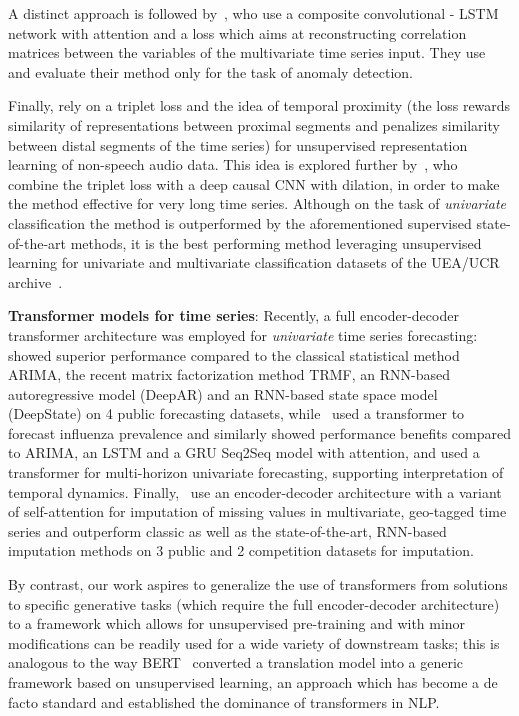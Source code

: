\documentclass{article} \usepackage{iclr2021_conference,times}
\begin{document}
A distinct approach is followed by~\citet{mscred_2019}, who use a composite convolutional - LSTM network with attention and a loss which aims at reconstructing correlation matrices between the variables of the multivariate time series input. They use and evaluate their method only for the task of anomaly detection.

Finally, \citet{jansen_unsupervised_2018} rely on a triplet loss and the idea of temporal proximity (the loss rewards similarity of representations between proximal segments and penalizes similarity between distal segments of the time series) for unsupervised representation learning of non-speech audio data. This idea is explored further by~\citet{franceschi19}, who combine the triplet loss with a deep causal CNN with dilation, in order to make the method effective for very long time series. Although on the task of \textit{univariate} classification the method is outperformed by the aforementioned supervised state-of-the-art methods, it is the best performing method leveraging unsupervised learning for univariate and multivariate classification datasets of the UEA/UCR archive~\citep{classification_archive}.


\textbf{Transformer models for time series}:
Recently, a full encoder-decoder transformer architecture was employed for \textit{univariate} time series forecasting: \citet{li2019enhancing} showed superior performance compared to the classical statistical method ARIMA, the recent matrix factorization method TRMF, an RNN-based autoregressive model (DeepAR) and an RNN-based state space model (DeepState) on 4 public forecasting datasets,  while~\citet{transformer_influenza} used a transformer to forecast influenza prevalence and similarly showed performance benefits compared to ARIMA, an LSTM and a GRU Seq2Seq model with attention, and \citet{lim2020temporal} used a transformer for multi-horizon univariate forecasting, supporting interpretation of temporal dynamics. Finally,~\cite{Ma2019CDSACS} use an encoder-decoder architecture with a variant of self-attention for imputation of missing values in multivariate, geo-tagged time series and outperform classic as well as the state-of-the-art, RNN-based imputation methods on 3 public and 2 competition datasets for imputation.

By contrast, our work aspires to generalize the use of transformers from solutions to specific generative tasks (which require the full encoder-decoder architecture) to a framework which allows for unsupervised pre-training and with minor modifications can be readily used for a wide variety of downstream tasks; this is analogous to the way BERT~\citep{devlin_bert_2018} converted a translation model into a generic framework based on unsupervised learning, an approach which has become a de facto standard and established the dominance of transformers in NLP.
\end{document}
